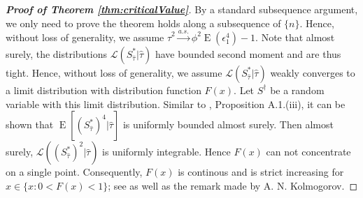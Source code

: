 \documentclass[11pt]{article}
\DeclareMathOperator{\myE}{E}
\theoremstyle{plain}
\theoremstyle{definition}
\theoremstyle{remark}
\begin{document}
\begin{appendices}
\begin{proof}[\textbf{Proof of Theorem \ref{thm:criticalValue}}]
    By a standard subsequence argument, we only need to prove the theorem holds along a subsequence of $\{n\}$.
    Hence, without loss of generality, we assume $\hat \tau^2 \xrightarrow{a.s.} \phi^2 \myE (\epsilon_1^4)-1$.
    Note that almost surely, the distributions $\mathcal L (S_{\hat \tau}^*  |\hat \tau)$
    have bounded second moment and are thus tight.
    Hence, without loss of generality, we assume $\mathcal L (S_{\hat \tau}^*  |\hat \tau)$ weakly converges to a limit distribution with distribution function $F(x)$.
    Let $S^\dagger$ be a random variable with this limit distribution.
    Similar to \cite{chen2010tests}, Proposition A.1.(iii), it can be shown that $\myE [(S^*_{\hat \tau})^4|\hat \tau]$ is uniformly bounded almost surely.
    Then almost surely, $\mathcal L ((S_{\hat \tau}^*)^2  |\hat \tau)$ is  uniformly integrable.
    Hence $F(x)$ can not concentrate on a single point.
    Consequently, $F(x)$ is continous and is strict increasing for $x\in\{x:0<F(x)<1\}$; see \cite{Sevast1961A} as well as the remark made by A. N. Kolmogorov.


\end{proof}
\end{appendices}
\end{document}
